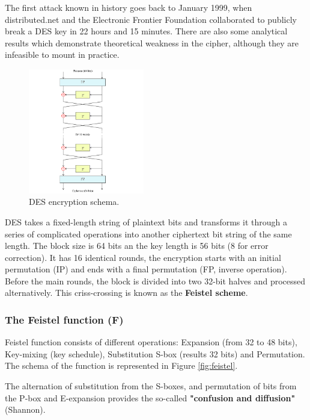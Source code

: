\documentclass[a4paper, 12pt]{report}
\begin{document}
The first attack known in history goes back to January 1999, when distributed.net and the Electronic Frontier Foundation collaborated to publicly break a DES key in 22 hours and 15 minutes. There are also some analytical results which demonstrate theoretical weakness in the cipher, although they are infeasible to mount in practice.

\begin{figure}
	\includegraphics[width=0.45\textwidth]{images/Lec10/DESschema.png}
	\caption{DES encryption schema.}
	\label{fig:desschema}
\end{figure}
DES takes a fixed-length string of plaintext bits and transforms it through a series of complicated operations into another ciphertext bit string of the same length. The block size is 64 bits an the key length is 56 bits (8 for error correction). It has 16 identical rounds, the encryption starts with an initial permutation (IP) and ends with a final permutation (FP, inverse operation). Before the main rounds, the block is divided into two 32-bit halves and processed alternatively. This criss-crossing is known as the \textbf{Feistel scheme}.

\subsubsection{The Feistel function (F)}
Feistel function consists of different operations: Expansion (from 32 to 48 bits), Key-mixing (key schedule), Substitution S-box (results 32 bits) and Permutation. The schema of the function is represented in Figure \ref{fig:feistel}.

The alternation of substitution from the S-boxes, and permutation of bits from the P-box and E-expansion provides the so-called \textbf{"confusion and diffusion"} (Shannon).
\end{document}
